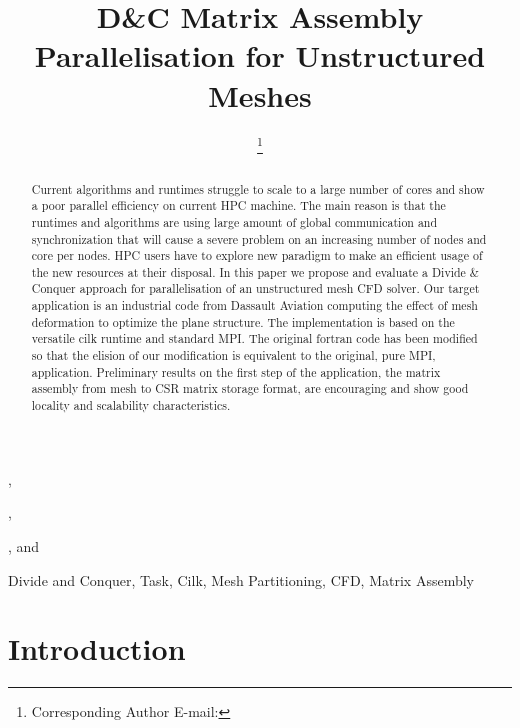 \documentclass{IOS-Book-Article}
\begin{document}
\begin{frontmatter}              %

\title{D\&C Matrix Assembly Parallelisation for Unstructured Meshes}

\author[A]{ %
\thanks{Corresponding Author E-mail: }},
\author[A]{ },
\author[B]{ },
and
\author[C]{ }

\address[A]{PRISM - University of Versailles, France}
\address[B]{Somwhere}
\address[C]{Dassault Aviation, Saint-Cloud, France}

\begin{abstract}
Current algorithms and runtimes struggle to scale to a large number of cores and show a poor parallel efficiency on current HPC machine.
The main reason is that the runtimes and algorithms are using large amount of global communication and synchronization that will cause a severe problem on an increasing
number of nodes and core per nodes. HPC users have to explore new paradigm to make an efficient usage of the new resources at their disposal.
In this paper we propose and evaluate a Divide \& Conquer approach for parallelisation of an unstructured mesh CFD solver.
Our target application is an industrial code from Dassault Aviation computing the effect of mesh deformation to optimize the plane structure.
The implementation is based on the versatile cilk runtime and standard MPI. The original fortran code has been modified so that the elision of our modification
is equivalent to the original, pure MPI, application. Preliminary results on the first step of the application, the matrix assembly from mesh to CSR matrix storage format,
are encouraging and show good locality and scalability characteristics.

\end{abstract}

\begin{keyword}
Divide and Conquer, Task, Cilk, Mesh Partitioning, CFD, Matrix Assembly 
\end{keyword}
\end{frontmatter}

\thispagestyle{empty}
\pagestyle{empty}

\section*{Introduction}
\end{document}
